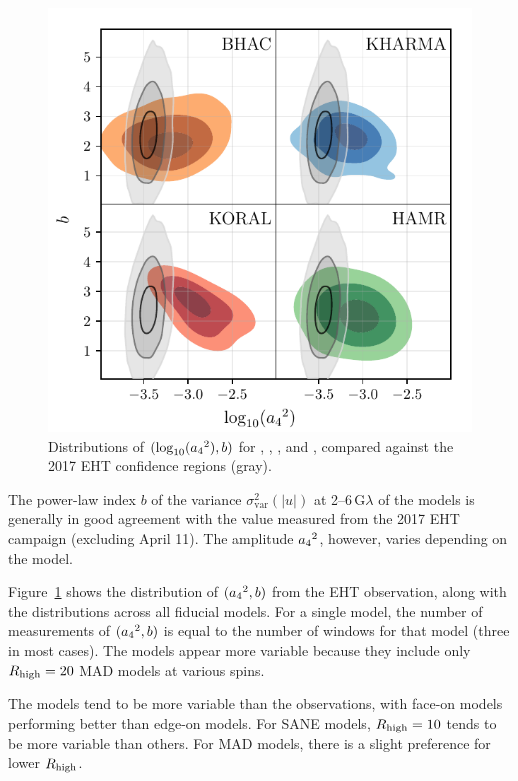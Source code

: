 \begin{figure}
  \centering
  \includegraphics[width=\columnwidth]{./figures/grmhd_triangle_debiased_combined.pdf}
  \caption{Distributions of $(\log_{10}({a_4}^2), b)$ for \bhac, \kharma, \koral, and \hamr, compared against the 2017 EHT confidence regions (gray).}
  \label{fig:cmp_VLBI_var}
\end{figure}

The power-law index $b$ of the variance $\sigma_\text{var}^2 (|u|)$ at 2--6\,G$\lambda$ of the models is generally in good agreement with the value measured  from the 2017 EHT campaign (excluding April 11).
The amplitude ${a_4}^2$, however, varies depending on the model.

Figure~\ref{fig:cmp_VLBI_var} shows the distribution of $({a_4}^2, b)$ from the EHT observation, along with the distributions across all fiducial models.
For a single model, the number of measurements of $({a_4}^2, b)$ is equal to the number of windows for that model (three in most cases).  The \koral models appear more variable because they include only $R_\mathrm{high} = 20$ MAD models at various spins.  

The models tend to be more variable than the observations, with face-on models performing better than edge-on models.
For SANE models, $R_\mathrm{high} = 10$ tends to be more variable than others.
For MAD models, there is a slight preference for lower $R_\mathrm{high}$.

